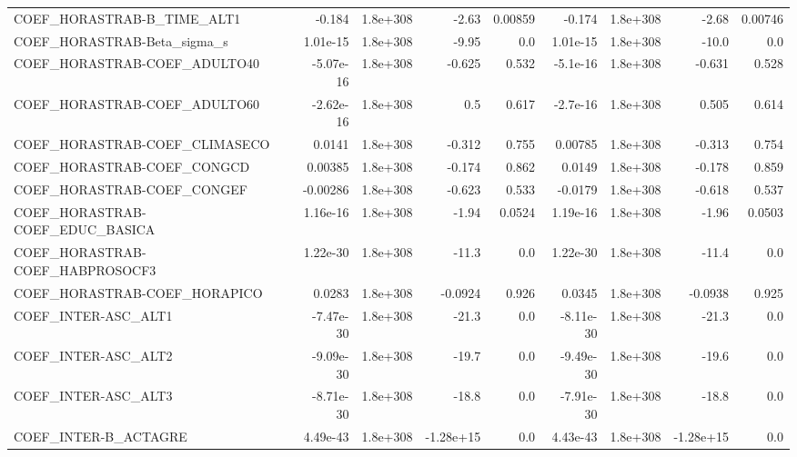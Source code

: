 \begin{tabular}{lrrrrrrrr}
COEF\_HORASTRAB-B\_TIME\_ALT1        &      -0.184 &     1.8e+308 &     -2.63 &  0.00859 &     -0.174 &    1.8e+308 &        -2.68 &       0.00746 \\
COEF\_HORASTRAB-Beta\_sigma\_s       &    1.01e-15 &     1.8e+308 &     -9.95 &      0.0 &   1.01e-15 &    1.8e+308 &        -10.0 &           0.0 \\
COEF\_HORASTRAB-COEF\_ADULTO40      &   -5.07e-16 &     1.8e+308 &    -0.625 &    0.532 &   -5.1e-16 &    1.8e+308 &       -0.631 &         0.528 \\
COEF\_HORASTRAB-COEF\_ADULTO60      &   -2.62e-16 &     1.8e+308 &       0.5 &    0.617 &   -2.7e-16 &    1.8e+308 &        0.505 &         0.614 \\
COEF\_HORASTRAB-COEF\_CLIMASECO     &      0.0141 &     1.8e+308 &    -0.312 &    0.755 &    0.00785 &    1.8e+308 &       -0.313 &         0.754 \\
COEF\_HORASTRAB-COEF\_CONGCD        &     0.00385 &     1.8e+308 &    -0.174 &    0.862 &     0.0149 &    1.8e+308 &       -0.178 &         0.859 \\
COEF\_HORASTRAB-COEF\_CONGEF        &    -0.00286 &     1.8e+308 &    -0.623 &    0.533 &    -0.0179 &    1.8e+308 &       -0.618 &         0.537 \\
COEF\_HORASTRAB-COEF\_EDUC\_BASICA   &    1.16e-16 &     1.8e+308 &     -1.94 &   0.0524 &   1.19e-16 &    1.8e+308 &        -1.96 &        0.0503 \\
COEF\_HORASTRAB-COEF\_HABPROSOCF3   &    1.22e-30 &     1.8e+308 &     -11.3 &      0.0 &   1.22e-30 &    1.8e+308 &        -11.4 &           0.0 \\
COEF\_HORASTRAB-COEF\_HORAPICO      &      0.0283 &     1.8e+308 &   -0.0924 &    0.926 &     0.0345 &    1.8e+308 &      -0.0938 &         0.925 \\
COEF\_INTER-ASC\_ALT1               &   -7.47e-30 &     1.8e+308 &     -21.3 &      0.0 &  -8.11e-30 &    1.8e+308 &        -21.3 &           0.0 \\
COEF\_INTER-ASC\_ALT2               &   -9.09e-30 &     1.8e+308 &     -19.7 &      0.0 &  -9.49e-30 &    1.8e+308 &        -19.6 &           0.0 \\
COEF\_INTER-ASC\_ALT3               &   -8.71e-30 &     1.8e+308 &     -18.8 &      0.0 &  -7.91e-30 &    1.8e+308 &        -18.8 &           0.0 \\
COEF\_INTER-B\_ACTAGRE              &    4.49e-43 &     1.8e+308 & -1.28e+15 &      0.0 &   4.43e-43 &    1.8e+308 &    -1.28e+15 &           0.0 \\

\end{tabular}
